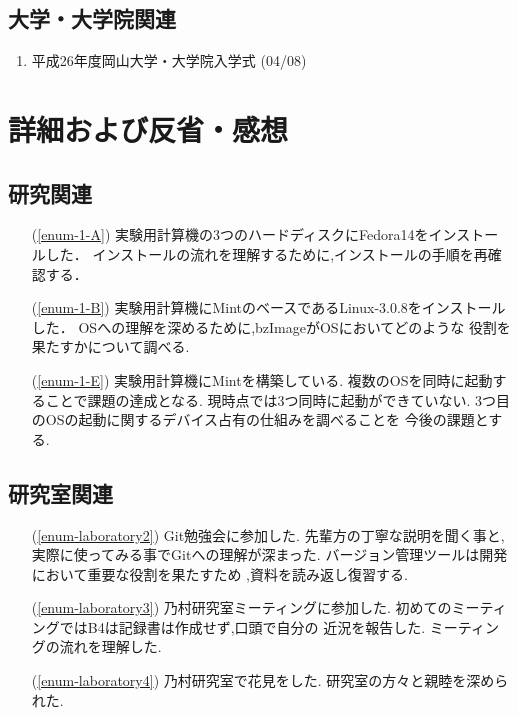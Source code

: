 \documentclass[fleqn, 14pt]{extarticle}
\begin{document}
\subsection{大学・大学院関連}
\label{sec-2-3}
\begin{enumerate}
\item 平成26年度岡山大学・大学院入学式
\hfill
\label{enum-university1}
(04/08)
\end{enumerate}

\section{詳細および反省・感想}
\label{sec-3}
\subsection{研究関連}
\label{sec-3-1}
\begin{itemize}
\item[(\ref{enum-1-A})]
実験用計算機の3つのハードディスクにFedora14をインストールした．
インストールの流れを理解するために,インストールの手順を再確認する．
\item[(\ref{enum-1-B})]
実験用計算機にMintのベースであるLinux-3.0.8をインストールした．
OSへの理解を深めるために,bzImageがOSにおいてどのような
役割を果たすかについて調べる.
\item[(\ref{enum-1-E})]
実験用計算機にMintを構築している.
複数のOSを同時に起動することで課題の達成となる.
現時点では3つ同時に起動ができていない.
3つ目のOSの起動に関するデバイス占有の仕組みを調べることを
今後の課題とする.
\end{itemize}

\subsection{研究室関連}
\label{sec-3-2}
\begin{itemize}
\item[(\ref{enum-laboratory2})]
Git勉強会に参加した.
先輩方の丁寧な説明を聞く事と,
実際に使ってみる事でGitへの理解が深まった.
バージョン管理ツールは開発において重要な役割を果たすため
,資料を読み返し復習する.
\item[(\ref{enum-laboratory3})]
乃村研究室ミーティングに参加した.
初めてのミーティングではB4は記録書は作成せず,口頭で自分の
近況を報告した.
ミーティングの流れを理解した.
\item[(\ref{enum-laboratory4})]
乃村研究室で花見をした.
研究室の方々と親睦を深められた.

\end{itemize}
\end{document}
